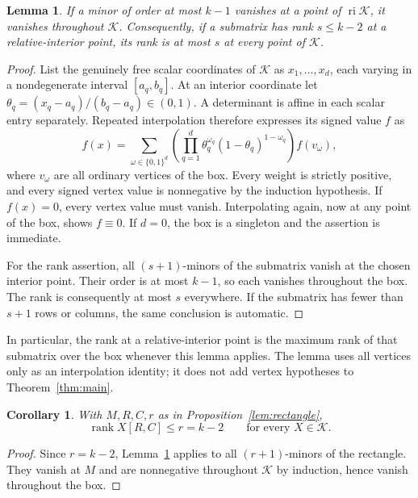 \documentclass[10pt,a4paper]{article}
\newtheorem{lemma}[theorem]{Lemma}
\newtheorem{corollary}[theorem]{Corollary}
\theoremstyle{definition}
\theoremstyle{remark}
\numberwithin{equation}{section}
\newcommand{\K}{\mathcal K}
\DeclareMathOperator{\rank}{rank}
\DeclareMathOperator{\ri}{ri}
\begin{document}
\begin{lemma}\label{lem:permanent}
If a minor of order at most $k-1$ vanishes at a point of $\ri\K$,
it vanishes throughout $\K$. Consequently, if a submatrix has rank
$s\leq k-2$ at a relative-interior point, its rank is at most $s$
at every point of $\K$.
\end{lemma}

\begin{proof}
List the genuinely free scalar coordinates of $\K$ as
$x_1,\ldots,x_d$, each varying in a nondegenerate interval
$[a_q,b_q]$. At an interior coordinate let
$\theta_q=(x_q-a_q)/(b_q-a_q)\in(0,1)$. A determinant is affine
in each scalar entry separately. Repeated interpolation therefore
expresses its signed value $f$ as
\begin{equation}\label{eq:interpolate}
 f(x)=\sum_{\omega\in\{0,1\}^d}
 \left(\prod_{q=1}^d\theta_q^{\omega_q}
            (1-\theta_q)^{1-\omega_q}\right) f(v_\omega),
\end{equation}
where $v_\omega$ are all ordinary vertices of the box. Every
weight is strictly positive, and every signed vertex value is
nonnegative by the induction hypothesis. If $f(x)=0$, every
vertex value must vanish. Interpolating again, now at any point of
the box, shows $f\equiv0$. If $d=0$, the box is a singleton and
the assertion is immediate.

For the rank assertion, all $(s+1)$-minors of the submatrix vanish
at the chosen interior point. Their order is at most $k-1$, so
each vanishes throughout the box. The rank is consequently at
most $s$ everywhere. If the submatrix has fewer than $s+1$ rows
or columns, the same conclusion is automatic.
\end{proof}

In particular, the rank at a relative-interior point is the maximum
rank of that submatrix over the box whenever this lemma applies.
The lemma uses all vertices only as an interpolation identity; it
does not add vertex hypotheses to Theorem~\ref{thm:main}.


\begin{corollary}\label{cor:permanent-rank}
With $M,R,C,r$ as in Proposition~\ref{lem:rectangle},
\begin{equation}\label{eq:rank-box}
 \rank X[R,C]\leq r=k-2\qquad\text{for every }X\in\K.
\end{equation}
\end{corollary}

\begin{proof}
Since $r=k-2$, Lemma~\ref{lem:permanent} applies to all $(r+1)$-minors
of the rectangle. They vanish at $M$ and are nonnegative throughout $\K$
by induction, hence vanish throughout the box.
\end{proof}
\end{document}
